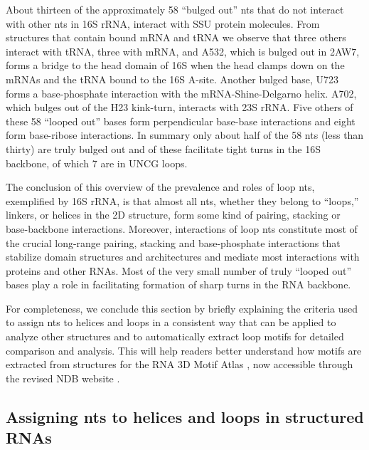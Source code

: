 About thirteen of the approximately 58 ``bulged out'' nts that do not interact
with other nts in \EC{} 16S rRNA, interact with SSU protein molecules. From
structures that contain bound mRNA and tRNA we observe that three others
interact with tRNA, three with mRNA, and A532, which is bulged out in 2AW7,
forms a bridge to the head domain of 16S when the head clamps down on the mRNAs
and the tRNA bound to the 16S A-site. Another bulged base, U723 forms a
base-phosphate interaction with the mRNA-Shine-Delgarno helix. A702, which
bulges out of the H23 kink-turn, interacts with 23S rRNA. Five others of these
58 ``looped out'' bases form perpendicular base-base interactions and eight form
base-ribose interactions. In summary only about half of the 58 nts (less than
thirty) are truly bulged out and of these  facilitate tight turns in the 16S
backbone, of which 7 are in UNCG loops. 

The conclusion of this overview of the prevalence and roles of loop nts,
exemplified by 16S rRNA, is that almost all nts, whether they belong to ``loops,''
linkers, or helices in the 2D structure, form some kind of pairing, stacking or
base-backbone interactions. Moreover, interactions of loop nts constitute most
of the crucial long-range pairing, stacking and base-phosphate interactions that
stabilize domain structures and architectures and mediate most interactions with
proteins and other RNAs. Most of the very small number of truly “looped out”
bases play a role in facilitating formation of sharp \degree turns in the RNA
backbone. 

For completeness, we conclude this section by briefly explaining the criteria
used to assign nts to helices and loops in a consistent way that can be applied
to analyze other structures and to automatically extract loop motifs for
detailed comparison and analysis.  This will help readers better understand how
motifs are extracted from structures for the RNA 3D Motif Atlas \cite{Petrov2013}, now
accessible through the revised NDB website \cite{CoimbatoreNarayanan2014}. 

\subsection{Assigning nts to helices and loops in structured RNAs}

